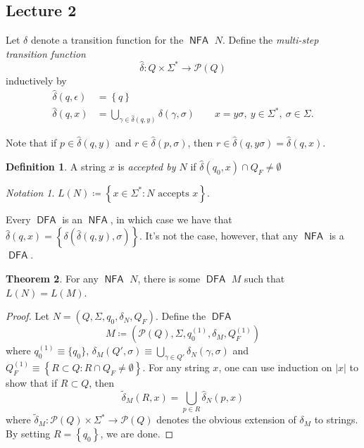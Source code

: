 \documentclass[10pt,letterpaper,cm]{nupset}
\theoremstyle{definition}
\newtheorem{definition}{Definition}[subsection]
\theoremstyle{theorem}
\newtheorem{theorem}[definition]{Theorem}
\theoremstyle{remark}
\newtheorem*{notation}{Notation}
\renewcommand{\P}{\mathcal P}
\newcommand{\1}{\mathbf{1}}
\newcommand{\0}{\vec 0}
\DeclareMathOperator{\DFA}{\mathsf{DFA}}
\DeclareMathOperator{\NFA}{\mathsf{NFA}}
\begin{document}
\subsection{Lecture 2}


Let $\delta$ denote a transition function for the $\NFA$ $N$. Define the \textit{multi-step transition function} $$\hat{\delta} : Q\times \Sigma^{\ast} \to \P(Q)$$ inductively by
\begin{align*}
 \hat{\delta}(q, \epsilon) & = \left\{q\right\}
\\  \hat{\delta} (q, x) & = \bigcup_{\gamma \in \hat{\delta}(q, y)}\delta(\gamma, \sigma) \quad \quad x = y\sigma, \ y \in \Sigma^{\ast}, \ \sigma \in \Sigma.
\end{align*}


Note that if $p\in \hat{\delta}(q,y)$ and $r\in \hat{\delta}(p, \sigma)$, then $r\in \hat{\delta}(q, y\sigma) = \hat{\delta}(q, x)$.


\begin{definition}
A string $x$ is \textit{accepted by $N$} if $\hat{\delta}(q_0, x) \cap Q_F \ne \emptyset$
\end{definition}

\begin{notation}
$L(N) \coloneqq \left\{x \in \Sigma^{\ast} : N \text{ accepts } x\right\}$.
\end{notation}

\smallskip

Every $\DFA$ is an $\NFA$, in which case we have that $\hat{\delta}(q,x) =\left\{\delta\left(\hat{\delta}(q,y), \sigma\right)\right\}$. It's not the case, however, that any $\NFA$ is a $\DFA$.

\smallskip

\begin{theorem}\label{same}
For any $\NFA$ $N$, there is some $\DFA$ $M$ such that $L(N) = L(M)$.
\end{theorem}
\begin{proof}
Let $N = \left(Q, \Sigma, q_0, \delta_N, Q_F\right)$. Define the $\DFA$ $$M \coloneqq \left(\P(Q), \Sigma, q_0^{(1)} , \delta_M, Q_F^{(1)} \right)$$ where $q_0^{(1)} \equiv \{q_0\}$, $\delta_M (Q', \sigma) \equiv \bigcup_{\gamma \in Q'} \delta_N(\gamma, \sigma)$ and $Q_F^{(1)} \equiv \left\{R \subset Q : R\cap Q_F \ne \emptyset\right\}$. For any string $x$, one can use induction on $\left\lvert{x}\right\rvert$ to show that if $R\subset Q$, then $$\tilde{\delta}_M(R, x) = \bigcup_{p\in R} \hat{\delta}_N(p,x)$$ where $\tilde{\delta}_M : \P(Q) \times \Sigma^{\ast} \to \P(Q)$ denotes the obvious extension of $\delta_M$ to strings.  By setting $R= \left\{q_0\right\}$, we are done.
\end{proof}
\end{document}
